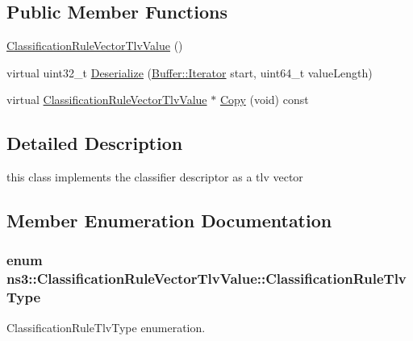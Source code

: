 \subsection*{Public Member Functions}
\begin{DoxyCompactItemize}
\item 
\hyperlink{classns3_1_1ClassificationRuleVectorTlvValue_a422e2f23f05409533c6addd34748c9f1}{Classification\+Rule\+Vector\+Tlv\+Value} ()
\item 
virtual uint32\+\_\+t \hyperlink{classns3_1_1ClassificationRuleVectorTlvValue_adb71f8c6a4456630500606bdacffd8c5}{Deserialize} (\hyperlink{classns3_1_1Buffer_1_1Iterator}{Buffer\+::\+Iterator} start, uint64\+\_\+t value\+Length)
\item 
virtual \hyperlink{classns3_1_1ClassificationRuleVectorTlvValue}{Classification\+Rule\+Vector\+Tlv\+Value} $\ast$ \hyperlink{classns3_1_1ClassificationRuleVectorTlvValue_a81c85508fe2e5891a3e1eab5b9f68b83}{Copy} (void) const 
\end{DoxyCompactItemize}


\subsection{Detailed Description}
this class implements the classifier descriptor as a tlv vector 

\subsection{Member Enumeration Documentation}
\subsubsection[{\texorpdfstring{Classification\+Rule\+Tlv\+Type}{ClassificationRuleTlvType}}]{\setlength{\rightskip}{0pt plus 5cm}enum {\bf ns3\+::\+Classification\+Rule\+Vector\+Tlv\+Value\+::\+Classification\+Rule\+Tlv\+Type}}\hypertarget{classns3_1_1ClassificationRuleVectorTlvValue_a9945c44c631de44d3b9c8dc9560cb820}{}\label{classns3_1_1ClassificationRuleVectorTlvValue_a9945c44c631de44d3b9c8dc9560cb820}


Classification\+Rule\+Tlv\+Type enumeration. 

